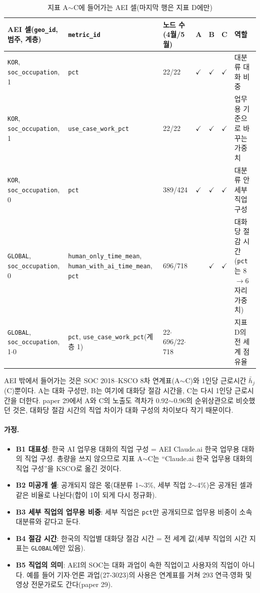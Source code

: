 \documentclass[11pt]{article}
\begin{document}
\begin{longtable}{L{4.4cm}L{3.4cm}R{1.6cm}L{1.0cm}L{1.0cm}L{1.0cm}L{3.6cm}}
\caption{지표 A$\sim$C에 들어가는 AEI 셀(마지막 행은 지표 D에만)}\label{tab:bridge}\\
\toprule
AEI 셀(\texttt{geo\_id}, 범주, 계층) & \texttt{metric\_id} & 노드 수(4월/5월) & A & B & C & 역할 \\
\midrule
\endfirsthead
\texttt{KOR}, \texttt{soc\_occupation}, 1 & \texttt{pct} & 22/22 & $\checkmark$ & $\checkmark$ & $\checkmark$ & 대분류 대화 비중 \\
\texttt{KOR}, \texttt{soc\_occupation}, 1 & \texttt{use\_case\_work\_pct} & 22/22 & $\checkmark$ & $\checkmark$ & $\checkmark$ & 업무용 기준으로 바꾸는 가중치 \\
\texttt{KOR}, \texttt{soc\_occupation}, 0 & \texttt{pct} & 389/424 & $\checkmark$ & $\checkmark$ & $\checkmark$ & 대분류 안 세부 직업 구성 \\
\texttt{GLOBAL}, \texttt{soc\_occupation}, 0 & \texttt{human\_only\_time\_mean}, \texttt{human\_with\_ai\_time\_mean}, \texttt{pct} & 696/718 & & $\checkmark$ & $\checkmark$ & 대화당 절감 시간(\texttt{pct}는 8$\to$6자리 가중치) \\
\texttt{GLOBAL}, \texttt{soc\_occupation}, 1$\cdot$0 & \texttt{pct}, \texttt{use\_case\_work\_pct}(계층 1) & 22$\cdot$696/22$\cdot$718 & & & & 지표 D의 전 세계 점유율 \\
\bottomrule
\end{longtable}

AEI 밖에서 들어가는 것은 SOC 2018--KSCO 8차 연계표(A$\sim$C)와 1인당 근로시간 $\bar h_j$(C)뿐이다. A는 대화 구성만, B는 여기에 대화당 절감 시간을, C는 다시 1인당 근로시간을 더한다. paper 29에서 A와 C의 노출도 격차가 0.92$\sim$0.96의 순위상관으로 비슷했던 것은, 대화당 절감 시간의 직업 차이가 대화 구성의 차이보다 작기 때문이다.

\paragraph{가정.}
\begin{itemize}[leftmargin=*]
  \item \textbf{B1 대표성}: 한국 AI 업무용 대화의 직업 구성 = AEI Claude.ai 한국 업무용 대화의 직업 구성. 총량을 쓰지 않으므로 지표 A$\sim$C는 ``Claude.ai 한국 업무용 대화의 직업 구성''을 KSCO로 옮긴 것이다.
  \item \textbf{B2 미공개 셀}: 공개되지 않은 몫(대분류 1$\sim$3\%, 세부 직업 2$\sim$4\%)은 공개된 셀과 같은 비율로 나뉜다(합이 1이 되게 다시 정규화).
  \item \textbf{B3 세부 직업의 업무용 비중}: 세부 직업은 \texttt{pct}만 공개되므로 업무용 비중이 소속 대분류와 같다고 둔다.
  \item \textbf{B4 절감 시간}: 한국의 직업별 대화당 절감 시간 = 전 세계 값(세부 직업의 시간 지표는 \texttt{GLOBAL}에만 있음).
  \item \textbf{B5 직업의 의미}: AEI의 SOC는 대화 과업이 속한 직업이고 사용자의 직업이 아니다. 예를 들어 기자$\cdot$언론 과업(27-3023)의 사용은 연계표를 거쳐 293 연극$\cdot$영화 및 영상 전문가로도 간다(paper 29).
\end{itemize}
\end{document}
